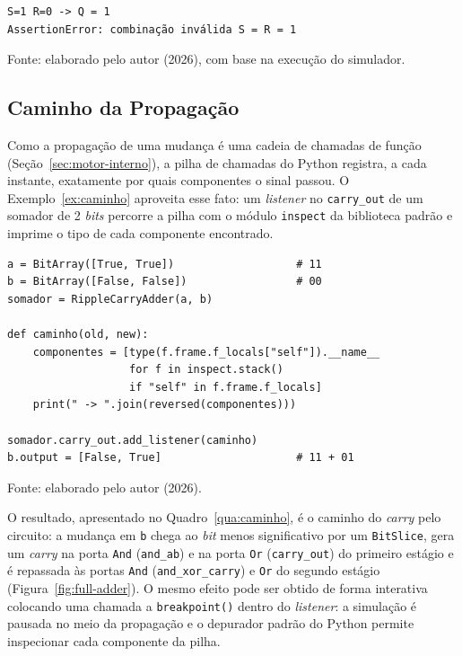 \begin{quadro}[H]
\centering
\caption{Saída do Exemplo~\ref{ex:sonda}.}
\label{qua:sonda}
\begin{minipage}{0.7\textwidth}
\begin{verbatim}
S=1 R=0 -> Q = 1
AssertionError: combinação inválida S = R = 1
\end{verbatim}
\end{minipage}
\begin{center}
\footnotesize Fonte: elaborado pelo autor (2026), com base na execução do simulador.
\end{center}
\end{quadro}

\subsection{Caminho da Propagação}

Como a propagação de uma mudança é uma cadeia de chamadas de função (Seção~\ref{sec:motor-interno}), a pilha de chamadas do Python registra, a cada instante, exatamente por quais componentes o sinal passou. O Exemplo~\ref{ex:caminho} aproveita esse fato: um \textit{listener} no \texttt{carry\_out} de um somador de 2 \textit{bits} percorre a pilha com o módulo \texttt{inspect} da biblioteca padrão e imprime o tipo de cada componente encontrado.

\begin{exemplo}[H]
\caption{Reconstrução do caminho percorrido por uma mudança de sinal.}
\label{ex:caminho}
\begin{verbatim}
a = BitArray([True, True])                   # 11
b = BitArray([False, False])                 # 00
somador = RippleCarryAdder(a, b)

def caminho(old, new):
    componentes = [type(f.frame.f_locals["self"]).__name__
                   for f in inspect.stack()
                   if "self" in f.frame.f_locals]
    print(" -> ".join(reversed(componentes)))

somador.carry_out.add_listener(caminho)
b.output = [False, True]                     # 11 + 01
\end{verbatim}
\begin{center}
\footnotesize Fonte: elaborado pelo autor (2026).
\end{center}
\end{exemplo}

O resultado, apresentado no Quadro~\ref{qua:caminho}, é o caminho do \textit{carry} pelo circuito: a mudança em \texttt{b} chega ao \textit{bit} menos significativo por um \texttt{BitSlice}, gera um \textit{carry} na porta \texttt{And} (\texttt{and\_ab}) e na porta \texttt{Or} (\texttt{carry\_out}) do primeiro estágio e é repassada às portas \texttt{And} (\texttt{and\_xor\_carry}) e \texttt{Or} do segundo estágio (Figura~\ref{fig:full-adder}). O mesmo efeito pode ser obtido de forma interativa colocando uma chamada a \texttt{breakpoint()} dentro do \textit{listener}: a simulação é pausada no meio da propagação e o depurador padrão do Python permite inspecionar cada componente da pilha.

